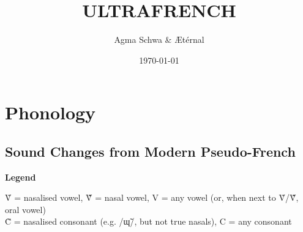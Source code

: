 \documentclass[a4paper, 12pt, oneside, final]{article}
\title{ULTRAFRENCH}
\author{Agma Schwa \& Ætérnal}
\date{\today}
\def\parheading#1{\noindent\textbf{#1}}
\begin{document}
\maketitle
\clearpage

\section{Phonology}\label{sec:phonology}

\subsection{Sound Changes from Modern Pseudo-French}\label{subsec:sound-changes-from-modern-french}
\parheading{Legend}\par\medskip\noindent
Ṽ = nasalised vowel, Ṽ̃ = nasal vowel, V = any vowel (or, when next to Ṽ/Ṽ̃, oral vowel)\\
C̃ = nasalised consonant (e.g. /ɰ̃/, but not true nasals), C = any consonant\\
\end{document}
